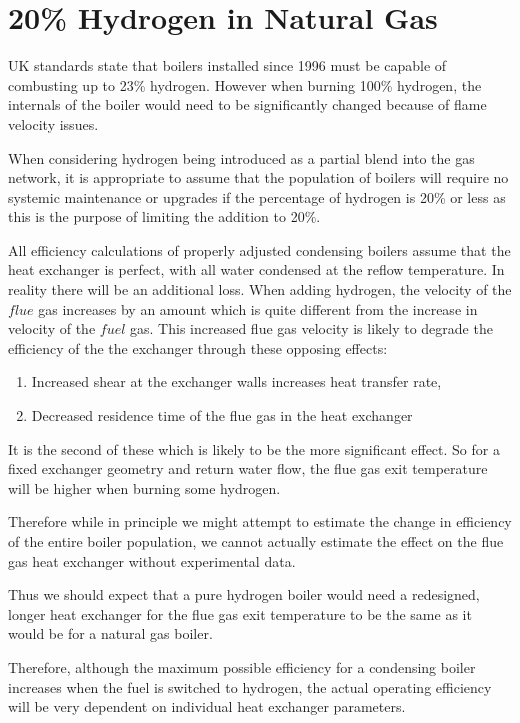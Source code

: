 \documentclass[5p]{elsarticle} %
\begin{document}
\section{20\% Hydrogen in Natural Gas}
\label{sec:H20-percent}

 UK standards state that boilers installed since 1996 must be capable\citep{H2Blends21} of combusting up to 23\% hydrogen. However when burning 100\% hydrogen, the internals of the boiler would need to be significantly changed because of flame velocity issues.

When considering hydrogen being introduced as a partial blend into the gas network, it is appropriate to assume that the population of boilers will require no systemic maintenance or upgrades if the percentage of hydrogen is 20\% or less as this is the purpose of limiting the addition to 20\%.

All efficiency calculations of properly adjusted condensing boilers assume that the heat exchanger is perfect, with all water condensed at the reflow temperature. In reality there will be an additional loss. When adding hydrogen, the velocity of the $flue$ gas increases by an amount which is quite different from the increase in velocity of the $fuel$ gas. This increased flue gas velocity is likely to degrade the efficiency of the the  exchanger through these opposing effects:

\begin{enumerate}
    \item Increased shear at the exchanger walls\citep{Bennet2017} increases heat transfer rate,
    \item Decreased residence time of the flue gas in the heat exchanger
\end{enumerate}
It is the second of these which is likely to be the more significant effect. So for a fixed exchanger geometry and return water flow, the flue gas exit temperature will be higher when burning some hydrogen.

 Therefore while in principle we might attempt to estimate the change in efficiency of the entire boiler population, we cannot actually estimate the effect on the flue gas heat exchanger without experimental data.

Thus we should expect that a pure hydrogen boiler would need a redesigned, longer heat exchanger for the flue gas exit temperature to be the same as it would be for a natural gas boiler.

Therefore, although the maximum possible efficiency for a condensing boiler increases when the fuel is switched to hydrogen, the actual operating efficiency will be very dependent on individual heat exchanger parameters\citep{DESNZ2023b, GASTEC2009}.
\end{document}
